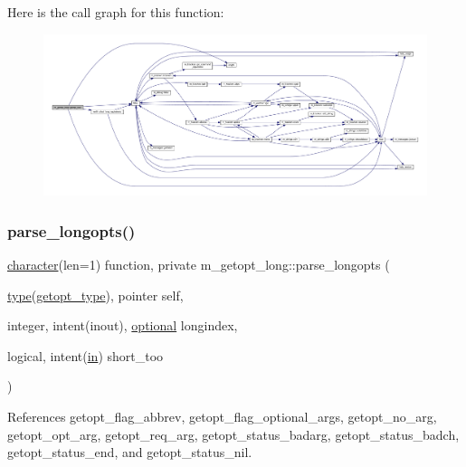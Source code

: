 Here is the call graph for this function\+:
\nopagebreak
\begin{figure}[H]
\begin{center}
\leavevmode
\includegraphics[width=350pt]{namespacem__getopt__long_af5aeba1b29425c5da2db9113aac0dc97_cgraph}
\end{center}
\end{figure}
\mbox{\label{namespacem__getopt__long_a7bad6d8d4067d578429da9282bc82ada}} 
\subsubsection{\texorpdfstring{parse\+\_\+longopts()}{parse\_longopts()}}
{\footnotesize\ttfamily \hyperlink{option__stopwatch_83_8txt_abd4b21fbbd175834027b5224bfe97e66}{character}(len=1) function, private m\+\_\+getopt\+\_\+long\+::parse\+\_\+longopts (\begin{DoxyParamCaption}\item[{\hyperlink{stop__watch_83_8txt_a70f0ead91c32e25323c03265aa302c1c}{type}(\hyperlink{structm__getopt__long_1_1getopt__type}{getopt\+\_\+type}), pointer}]{self,  }\item[{integer, intent(inout), \hyperlink{option__stopwatch_83_8txt_aa4ece75e7acf58a4843f70fe18c3ade5}{optional}}]{longindex,  }\item[{logical, intent(\hyperlink{M__journal_83_8txt_afce72651d1eed785a2132bee863b2f38}{in})}]{short\+\_\+too }\end{DoxyParamCaption})\hspace{0.3cm}{\ttfamily [private]}}



References getopt\+\_\+flag\+\_\+abbrev, getopt\+\_\+flag\+\_\+optional\+\_\+args, getopt\+\_\+no\+\_\+arg, getopt\+\_\+opt\+\_\+arg, getopt\+\_\+req\+\_\+arg, getopt\+\_\+status\+\_\+badarg, getopt\+\_\+status\+\_\+badch, getopt\+\_\+status\+\_\+end, and getopt\+\_\+status\+\_\+nil.

